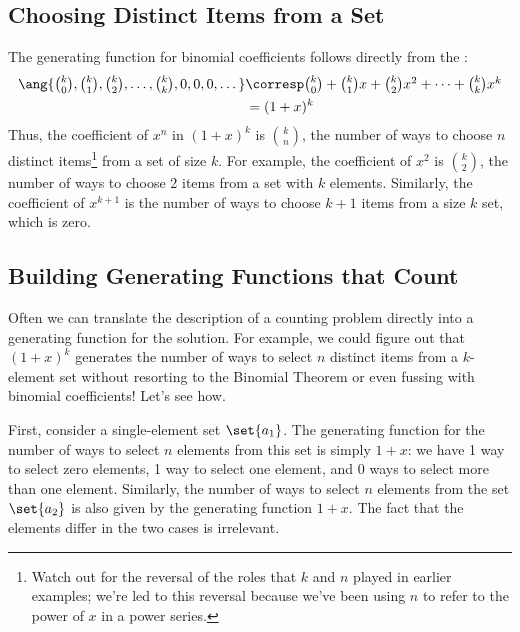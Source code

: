 \subsection{Choosing Distinct Items from a Set}

The generating function for binomial coefficients follows directly
from the :
%
\begin{align*}
\ang{\textstyle \binom{k}{0}, \binom{k}{1}, \binom{k}{2}, \dots, \binom{k}{k},
        0, 0, 0, \dots }
    & \corresp \textstyle \binom{k}{0} + \binom{k}{1} x + \binom{k}{2} x^2 + \cdots + \binom{k}{k} x^k \\
    & = (1 + x)^k
\end{align*}
Thus, the coefficient of $x^n$ in $(1 + x)^k$ is $\binom{k}{n}$, the
number of ways to choose $n$ distinct items\footnote{Watch out for the
  reversal of the roles that $k$ and $n$ played in earlier examples;
  we're led to this reversal because we've been using $n$ to refer to
  the power of $x$ in a power series.}  from a set of size $k$.  For
example, the coefficient of $x^2$ is $\binom{k}{2}$, the number of
ways to choose 2 items from a set with $k$ elements.  Similarly, the
coefficient of $x^{k+1}$ is the number of ways to choose $k+1$ items
from a size $k$ set, which is zero.

\subsection{Building Generating Functions that Count}

Often we can translate the description of a counting problem directly
into a generating function for the solution.  For example, we could
figure out that $(1 + x)^k$ generates the number of ways to select $n$
distinct items from a $k$-element set without resorting to the
Binomial Theorem or even fussing with binomial coefficients!  Let's
see how.

First, consider a single-element set $\set{a_1}$.  The
generating function for the number of ways to select $n$ elements from
this set is simply $1 + x$: we have 1 way to select zero elements, 1
way to select one element, and 0 ways to select more than one element.
Similarly, the number of ways to select $n$ elements from the set
$\set{a_2}$ is also given by the generating function $1 + x$.  The
fact that the elements differ in the two cases is irrelevant.

